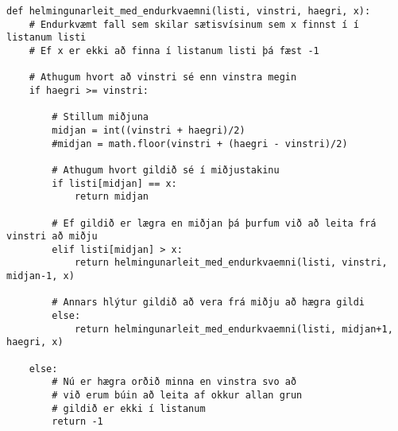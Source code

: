 \begin{lstlisting}[caption=Helmingunarleit að tölu í röðuðum lista með endurkvæmni, label=lst:reiknirit-helm-end]
def helmingunarleit_med_endurkvaemni(listi, vinstri, haegri, x): 
	# Endurkvæmt fall sem skilar sætisvísinum sem x finnst í í listanum listi
	# Ef x er ekki að finna í listanum listi þá fæst -1
	
	# Athugum hvort að vinstri sé enn vinstra megin
	if haegri >= vinstri: 
	
		# Stillum miðjuna
		midjan = int((vinstri + haegri)/2)
		#midjan = math.floor(vinstri + (haegri - vinstri)/2)
		
		# Athugum hvort gildið sé í miðjustakinu
		if listi[midjan] == x: 
			return midjan 
		
		# Ef gildið er lægra en miðjan þá þurfum við að leita frá vinstri að miðju
		elif listi[midjan] > x: 
			return helmingunarleit_med_endurkvaemni(listi, vinstri, midjan-1, x) 
	
		# Annars hlýtur gildið að vera frá miðju að hægra gildi
		else: 
			return helmingunarleit_med_endurkvaemni(listi, midjan+1, haegri, x) 
	
	else: 
		# Nú er hægra orðið minna en vinstra svo að
		# við erum búin að leita af okkur allan grun
		# gildið er ekki í listanum
		return -1
\end{lstlisting}





\newpage
